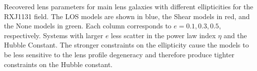 \label{fig:ecompare} Recovered lens parameters for main lens galaxies with different ellipticities for the RXJ1131 field. The LOS models are shown in blue, the Shear models in red, and the None models in green. Each column corresponds to $e = 0.1,0.3,0.5$, respectively. Systems with larger $e$ less scatter in the power law index $\eta$ and the Hubble Constant. The stronger constraints on the ellipticity cause the models to be less sensitive to the lens profile degeneracy and therefore produce tighter constraints on the Hubble constant.